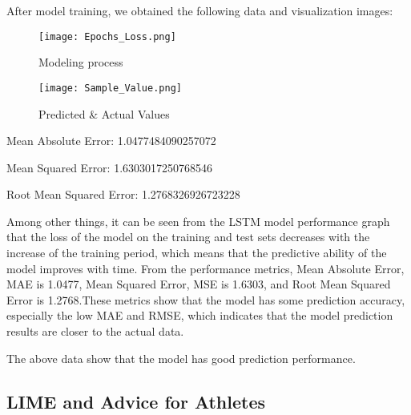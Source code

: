 \documentclass{mcmthesis}
\begin{document}
After model training, we obtained the following data and visualization images:
\begin{figure}[!ht]
    \centering
    \begin{minipage}{0.40\textwidth}
        \centering
        \texttt{[image: Epochs\_Loss.png]} %
        \caption{Modeling process}
        \label{fig:epochs_loss}
    \end{minipage}\hfill %
    \begin{minipage}{0.45\textwidth}
        \centering
        \texttt{[image: Sample\_Value.png]} %
        \caption{Predicted \& Actual Values}
        \label{fig:sample_value}
    \end{minipage}
\end{figure}


Mean Absolute Error: 1.0477484090257072

Mean Squared Error: 1.6303017250768546

Root Mean Squared Error: 1.2768326926723228





Among other things, it can be seen from the LSTM model performance graph that the loss of the model on the training and test sets decreases with the increase of the training period, which means that the predictive ability of the model improves with time. From the performance metrics, Mean Absolute Error, MAE is 1.0477, Mean Squared Error, MSE is 1.6303, and Root Mean Squared Error is 1.2768.These metrics show that the model has some prediction accuracy, especially the low MAE and RMSE, which indicates that the model prediction results are closer to the actual data.

The above data show that the model has good prediction performance.


\subsection{LIME and Advice for Athletes}
\end{document}
